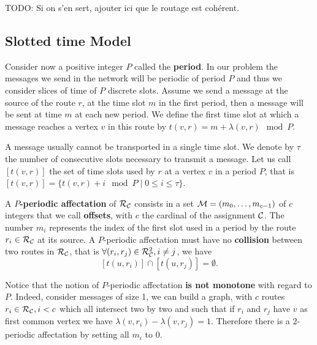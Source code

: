\documentclass[a4paper,10pt]{article}
\newcommand{\todo}[1]{{\color{red} TODO: {#1}}}
\begin{document}
      
      \todo{Si on s'en sert, ajouter ici que le routage est cohérent.}

   \subsection{Slotted time Model}
      Consider now a positive integer $P$ called the {\bf period}. In our problem the messages we send in the network will be periodic of period $P$ and thus we consider slices of time of $P$ discrete slots. Assume we send a message at the source of the route $r$,
      at the time slot $m$ in the first period, then a message will be sent at time $m$ at each new period. We define the first time slot at which a message reaches a vertex $v$ in this route by $t(v,r) = m + \lambda(v,r) \mod P$. 

      A message usually cannot be transported in a single time slot. We denote by $\tau$ the number 
      of consecutive slots necessary to transmit a message. Let us call $[t(v,r)]$ the set of time slots used by $r$ at a vertex $v$ in a period $P$, that is $[t(v,r)] = \{t(v,r) + i \mod P \mid 0 \leq i \leq \tau \}$.
      
      
      A {\bf $P$-periodic affectation} of $\cal R_{\cal C}$ consists in a set  ${\cal M}=(m_0, \ldots ,m_{c-1})$ of $c$ integers that we call {\bf offsets}, with $c$ the cardinal of the assignment $\cal C$. The number $m_i$ represents the index of the first slot used in a period  by the route $r_i \in {\cal R}_{\cal C}$ at its source.
      A $P$-periodic affectation must have no {\bf collision} between two routes in ${\cal R}_{\cal C}$, that is $\forall (r_i, r_j) \in {\cal R}_{\cal C}^2, i \neq j$, %
      we have $$[t(u,r_i)] \cap [t(u,r_j)] = \emptyset .$$
      

      Notice that the notion of $P$-periodic affectation \textbf{is not monotone} with regard to $P$. 
      Indeed, consider messages of size 1, we can build a graph, with $c$ routes $r_i \in {\cal R}_{\cal C}, i < c$ which all intersect two by two and
      such that if $r_i$ and $r_j$ have $v$ as first common vertex we have $\lambda(v,r_i) - \lambda(v,r_j)=1$.
      Therefore there is a $2$-periodic affectation by setting all $m_i$ to $0$.

%       
%       
      
\end{document}
